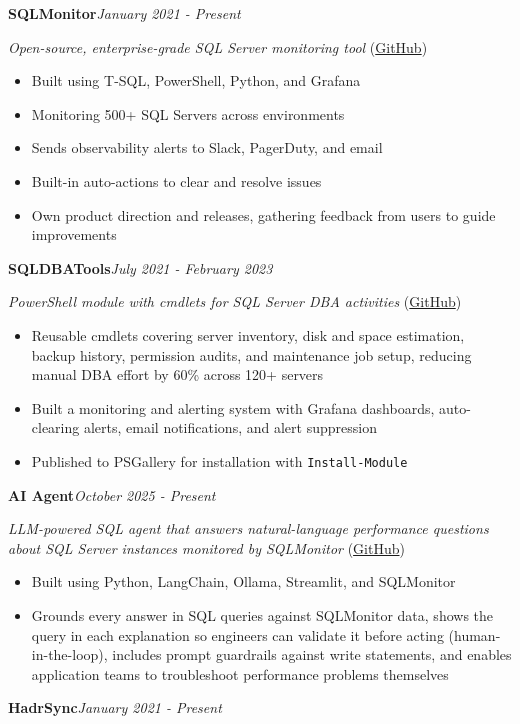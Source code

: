 \documentclass[10pt,a4paper]{article}
\begin{document}
\noindent\textbf{SQLMonitor}\hfill \textit{January 2021 - Present}

\textit{Open-source, enterprise-grade SQL Server monitoring tool} (\href{https://github.com/imajaydwivedi/SQLMonitor}{GitHub})
\begin{itemize}
  \item Built using T-SQL, PowerShell, Python, and Grafana
  \item Monitoring 500+ SQL Servers across environments
  \item Sends observability alerts to Slack, PagerDuty, and email
  \item Built-in auto-actions to clear and resolve issues
  \item Own product direction and releases, gathering feedback from users to guide improvements
\end{itemize}
\vspace{14.7pt}
\noindent\textbf{SQLDBATools}\hfill \textit{July 2021 - February 2023}

\textit{PowerShell module with cmdlets for SQL Server DBA activities} (\href{https://github.com/imajaydwivedi/SQLDBATools}{GitHub})
\begin{itemize}
  \item Reusable cmdlets covering server inventory, disk and space estimation, backup history, permission audits, and maintenance job setup, reducing manual DBA effort by 60\% across 120+ servers
  \item Built a monitoring and alerting system with Grafana dashboards, auto-clearing alerts, email notifications, and alert suppression
  \item Published to PSGallery for installation with \texttt{Install-Module}
\end{itemize}
\vspace{14.7pt}
\noindent\textbf{AI Agent}\hfill \textit{October 2025 - Present}

\textit{LLM-powered SQL agent that answers natural-language performance questions about SQL Server instances monitored by SQLMonitor} (\href{https://github.com/imajaydwivedi/SQLMonitor/tree/dev/AI-Agent}{GitHub})
\begin{itemize}
  \item Built using Python, LangChain, Ollama, Streamlit, and SQLMonitor
  \item Grounds every answer in SQL queries against SQLMonitor data, shows the query in each explanation so engineers can validate it before acting (human-in-the-loop), includes prompt guardrails against write statements, and enables application teams to troubleshoot performance problems themselves
\end{itemize}
\vspace{14.7pt}
\noindent\textbf{HadrSync}\hfill \textit{January 2021 - Present}
\end{document}
